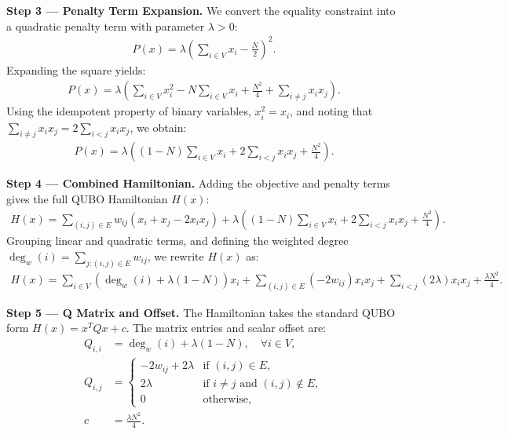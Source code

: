 \documentclass[12pt]{article}
\begin{document}
\textbf{Step 3 --- Penalty Term Expansion.}
We convert the equality constraint into a quadratic penalty term with parameter $\lambda > 0$:
\begin{align}
    P(x) = \lambda \left( \sum_{i \in V} x_i - \frac{N}{2} \right)^2.
\end{align}
Expanding the square yields:
\begin{align}
    P(x) = \lambda \left( \sum_{i \in V} x_i^2 - N \sum_{i \in V} x_i + \frac{N^2}{4} + \sum_{i \neq j} x_i x_j \right).
\end{align}
Using the idempotent property of binary variables, $x_i^2 = x_i$, and noting that $\sum_{i \neq j} x_i x_j = 2 \sum_{i < j} x_i x_j$, we obtain:
\begin{align}
    P(x) = \lambda \left( (1 - N) \sum_{i \in V} x_i + 2 \sum_{i < j} x_i x_j + \frac{N^2}{4} \right).
\end{align}

\textbf{Step 4 --- Combined Hamiltonian.}
Adding the objective and penalty terms gives the full QUBO Hamiltonian $H(x)$:
\begin{align}
    H(x) = \sum_{(i,j) \in E} w_{ij} (x_i + x_j - 2x_i x_j) + \lambda \left( (1 - N) \sum_{i \in V} x_i + 2 \sum_{i < j} x_i x_j + \frac{N^2}{4} \right).
\end{align}
Grouping linear and quadratic terms, and defining the weighted degree $\deg_w(i) = \sum_{j: (i,j) \in E} w_{ij}$, we rewrite $H(x)$ as:
\begin{align}
    H(x) = \sum_{i \in V} \left( \deg_w(i) + \lambda(1 - N) \right) x_i + \sum_{(i,j) \in E} (-2w_{ij}) x_i x_j + \sum_{i < j} (2\lambda) x_i x_j + \frac{\lambda N^2}{4}.
\end{align}

\textbf{Step 5 --- Q Matrix and Offset.}
The Hamiltonian takes the standard QUBO form $H(x) = x^T Q x + c$. The matrix entries and scalar offset are:
\begin{align}
    Q_{i,i} &= \deg_w(i) + \lambda(1 - N), \quad \forall i \in V, \\
    Q_{i,j} &= \begin{cases} 
        -2w_{ij} + 2\lambda & \text{if } (i,j) \in E, \\
        2\lambda & \text{if } i \neq j \text{ and } (i,j) \notin E, \\
        0 & \text{otherwise},
    \end{cases} \\
    c &= \frac{\lambda N^2}{4}.
\end{align}
\end{document}
